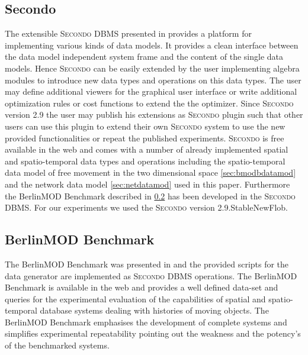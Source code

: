 \documentclass[a4paper]{article}
\newcommand{\secondo}{\textsc{Secondo}}
\newcommand{\bmodb} {BerlinMOD Benchmark}
\newcommand{\secver}{2.9.StableNewFlob}
\begin{document}
\subsection{Secondo}
\label{sec:secondo}
The extensible \secondo{} DBMS presented in \cite{686903,1054151} provides a
platform for implementing various kinds of data models. It provides a clean
interface between the data model independent system frame and the content of the
single data models. Hence \secondo{} can be easily extended by the user
implementing algebra modules to introduce  new data types and operations on
this data types. The user may define additional viewers for the graphical user
interface or write additional optimization rules or cost functions to extend the
the optimizer. Since \secondo{} version 2.9 the user may publish his extensions
as \secondo{} plugin such that other users can use this plugin to extend their own
\secondo{} system to use the new provided functionalities or repeat the published experiments.
\secondo{} is free available in the web \cite{secondoweb} and comes with a number
of already implemented spatial and spatio-temporal data types
and operations including the spatio-temporal data model of free movement in the
two dimensional space \ref{sec:bmodbdatamod} and the network data model
\ref{sec:netdatamod} used in this paper. Furthermore the \bmodb{} described in
\ref{sec:bmodb} has been developed in the \secondo{} DBMS. For our experiments
we used the \secondo{} version \secver{}.
\subsection{BerlinMOD Benchmark}
\label{sec:bmodb}
The \bmodb{} was presented in \cite{BerlinMODVLDB} \nocite{BerlinMOD} and the
provided scripts for the data generator are implemented as \secondo{} DBMS operations.
The \bmodb{} is available in the web \cite{berlinmodweb} and provides a well defined
data-set and queries for the experimental evaluation of the capabilities of
spatial and spatio-temporal database systems dealing with histories of moving
objects. The \bmodb{} emphasises the development of complete systems
and simplifies experimental repeatability pointing out the weakness and the potency's
of the benchmarked systems.
\end{document}
